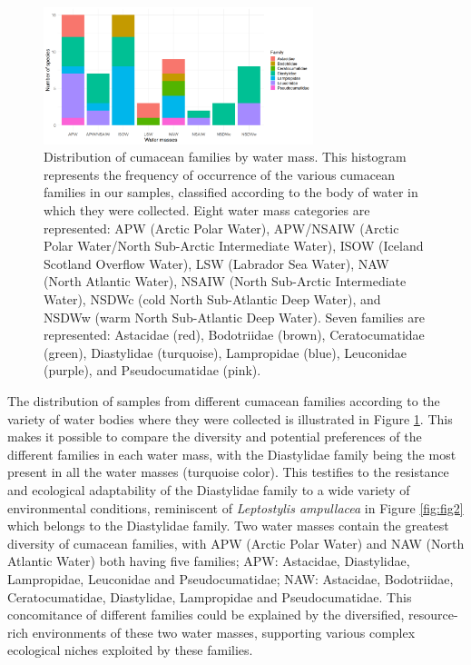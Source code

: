\begin{figure}[htbp]
    \centering
    \includegraphics[width=0.7\textwidth]{figure3.png}
    \caption{Distribution of cumacean families by water mass. This histogram represents the frequency of occurrence of the various cumacean families in our samples, classified according to the body of water in which they were collected. Eight water mass categories are represented: APW (Arctic Polar Water), APW/NSAIW (Arctic Polar Water/North Sub-Arctic Intermediate Water), ISOW (Iceland Scotland Overflow Water), LSW (Labrador Sea Water), NAW (North Atlantic Water), NSAIW (North Sub-Arctic Intermediate Water), NSDWc (cold North Sub-Atlantic Deep Water), and NSDWw (warm North Sub-Atlantic Deep Water). Seven families are represented: Astacidae (red), Bodotriidae (brown), Ceratocumatidae (green), Diastylidae (turquoise), Lampropidae (blue), Leuconidae (purple), and Pseudocumatidae (pink). \label{fig:fig3}}
\end{figure}

The distribution of samples from different cumacean families according to the variety of water bodies where they were collected is illustrated in Figure \ref{fig:fig3}. This makes it possible to compare the diversity and potential preferences of the different families in each water mass, with the Diastylidae family being the most present in all the water masses (turquoise color). This testifies to the resistance and ecological adaptability of the Diastylidae family to a wide variety of environmental conditions, reminiscent of \emph{Leptostylis ampullacea} in Figure \ref{fig:fig2} which belongs to the Diastylidae family. Two water masses contain the greatest diversity of cumacean families, with APW (Arctic Polar Water) and NAW (North Atlantic Water) both having five families; APW: Astacidae, Diastylidae, Lampropidae, Leuconidae and Pseudocumatidae; NAW: Astacidae, Bodotriidae, Ceratocumatidae, Diastylidae, Lampropidae and Pseudocumatidae. This concomitance of different families could be explained by the diversified, resource-rich environments of these two water masses, supporting various complex ecological niches exploited by these families.

